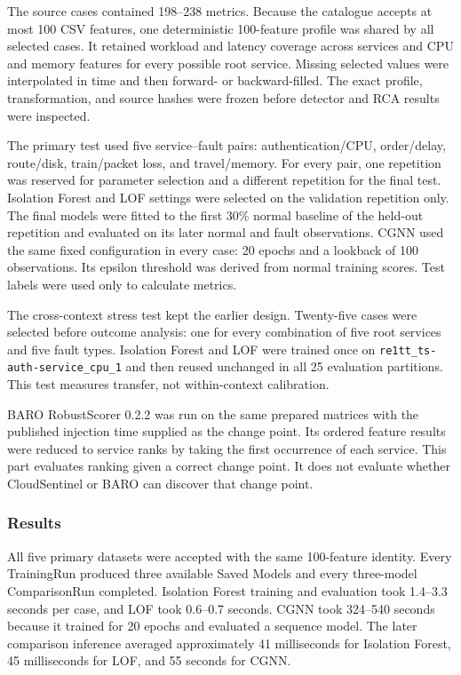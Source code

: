 The source cases contained 198--238 metrics. Because the catalogue accepts at most 100 CSV features, one deterministic 100-feature profile was shared by all selected cases. It retained workload and latency coverage across services and CPU and memory features for every possible root service. Missing selected values were interpolated in time and then forward- or backward-filled. The exact profile, transformation, and source hashes were frozen before detector and RCA results were inspected.

The primary test used five service--fault pairs: authentication/CPU, order/delay, route/disk, train/packet loss, and travel/memory. For every pair, one repetition was reserved for parameter selection and a different repetition for the final test. Isolation Forest and LOF settings were selected on the validation repetition only. The final models were fitted to the first 30\% normal baseline of the held-out repetition and evaluated on its later normal and fault observations. CGNN used the same fixed configuration in every case: 20 epochs and a lookback of 100 observations. Its epsilon threshold was derived from normal training scores. Test labels were used only to calculate metrics.

The cross-context stress test kept the earlier design. Twenty-five cases were selected before outcome analysis: one for every combination of five root services and five fault types. Isolation Forest and LOF were trained once on \texttt{re1tt\_ts-auth-service\_cpu\_1} and then reused unchanged in all 25 evaluation partitions. This test measures transfer, not within-context calibration.

BARO RobustScorer 0.2.2 was run on the same prepared matrices with the published injection time supplied as the change point. Its ordered feature results were reduced to service ranks by taking the first occurrence of each service. This part evaluates ranking given a correct change point. It does not evaluate whether CloudSentinel or BARO can discover that change point.

\subsubsection{Results}

All five primary datasets were accepted with the same 100-feature identity. Every TrainingRun produced three available Saved Models and every three-model ComparisonRun completed. Isolation Forest training and evaluation took 1.4--3.3 seconds per case, and LOF took 0.6--0.7 seconds. CGNN took 324--540 seconds because it trained for 20 epochs and evaluated a sequence model. The later comparison inference averaged approximately 41 milliseconds for Isolation Forest, 45 milliseconds for LOF, and 55 seconds for CGNN.

